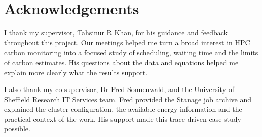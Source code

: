 \chapter*{Acknowledgements}
I thank my supervisor, Tahsinur R Khan, for his guidance and feedback throughout this project. Our meetings helped me turn a broad interest in HPC carbon monitoring into a focused study of scheduling, waiting time and the limits of carbon estimates. His questions about the data and equations helped me explain more clearly what the results support.

I also thank my co-supervisor, Dr Fred Sonnenwald, and the University of Sheffield Research IT Services team. Fred provided the Stanage job archive and explained the cluster configuration, the available energy information and the practical context of the work. His support made this trace-driven case study possible.
